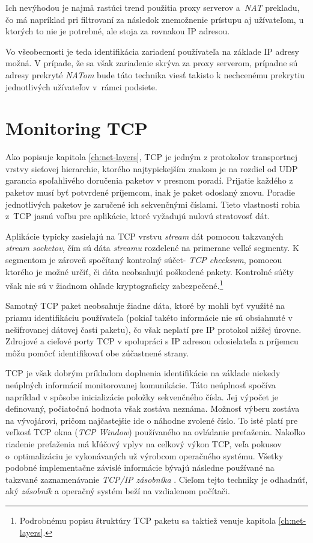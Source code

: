 \documentclass[
  digital, %
  oneside, %
  table,   %
  lof,     %
  nolot,   %
  nocover
]{fithesis3}
\begin{document}
Ich nevýhodou je najmä rastúci trend použitia proxy serverov a~\textit{NAT}
prekladu, čo má napríklad pri filtrovaní za následok znemožnenie prístupu aj
užívateľom, u ktorých to nie je potrebné, ale stoja za rovnakou IP adresou.

Vo všeobecnosti je teda identifikácia zariadení používateľa na základe IP
adresy možná. V prípade, že sa však zariadenie skrýva za proxy serverom,
prípadne sú adresy prekryté \textit{NATom} bude táto technika viesť takisto k
nechcenému prekrytiu jednotlivých užívateľov v~rámci podsiete.

\section{Monitoring TCP}
Ako popisuje kapitola \ref{ch:net-layers}, TCP
je jedným z protokolov transportnej
vrstvy sieťovej hierarchie, ktorého najtypickejším znakom je na rozdiel
od UDP garancia spoľahlivého doručenia paketov v presnom poradí. Prijatie
každého z paketov musí byť potvrdené príjemcom, inak je paket odoslaný znovu.
Poradie jednotlivých paketov je zaručené ich sekvenčnými číslami. Tieto 
vlastnosti robia z~TCP jasnú voľbu pre aplikácie, ktoré vyžadujú nulovú
stratovosť dát. 

Aplikácie typicky zasielajú na TCP vrstvu \textit{stream} dát
pomocou takzvaných \textit{stream socketov}, čím sú dáta \textit{streamu}
rozdelené na primerane veľké segmenty. K segmentom je zároveň spočítaný
kontrolný súčet- \textit{TCP checksum}, pomocou ktorého je možné určiť, či
dáta neobsahujú poškodené pakety. Kontrolné súčty však nie sú v žiadnom ohľade
kryptograficky zabezpečené.\footnote{Podrobnému popisu štruktúry TCP paketu sa
taktiež venuje kapitola \ref{ch:net-layers}.}

Samotný TCP paket neobsahuje žiadne dáta, ktoré by mohli byť využité na priamu
identifikáciu používateľa (pokiaľ takéto informácie nie sú obsiahnuté v
nešifrovanej dátovej časti paketu), čo však neplatí pre IP protokol nižšej
úrovne. Zdrojové a cieľové porty TCP v spolupráci s IP adresou odosielateľa a
príjemcu môžu pomôcť identifikovať obe zúčastnené strany.

TCP je však dobrým príkladom doplnenia identifikácie na základe niekedy neúplných
informácií monitorovanej komunikácie. Táto neúplnosť spočíva napríklad v
spôsobe inicializácie položky sekvenčného čísla. Jej výpočet je definovaný,
počiatočná hodnota však zostáva neznáma. Možnosť výberu zostáva na vývojárovi,
pričom najčastejšie ide o náhodne zvolené číslo. To isté platí pre veľkosť TCP
okna (\textit{TCP Window}) používaného na ovládanie preťaženia. Nakoľko
riadenie preťaženia má kľúčový vplyv na celkový výkon TCP, veľa pokusov
o~optimalizáciu je vykonávaných už výrobcom operačného systému.
Všetky podobné implementačne závislé informácie bývajú následne používané na takzvané
zaznamenávanie \textit{TCP/IP zásobníka} \cite{FIDIS:TCP}. Cieľom tejto techniky je odhadnúť,
aký \textit{zásobník} a operačný systém beží na vzdialenom počítači.
\end{document}

